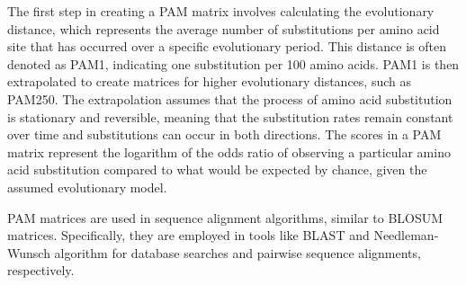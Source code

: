 The first step in creating a PAM matrix involves calculating the evolutionary distance, which represents the average number of substitutions per amino acid site that has occurred over a specific evolutionary period. This distance is often denoted as PAM1, indicating one substitution per 100 amino acids.  PAM1 is then extrapolated to create matrices for higher evolutionary distances, such as PAM250. The extrapolation assumes that the process of amino acid substitution is stationary and reversible, meaning that the substitution rates remain constant over time and substitutions can occur in both directions. The scores in a PAM matrix represent the logarithm of the odds ratio of observing a particular amino acid substitution compared to what would be expected by chance, given the assumed evolutionary model.

PAM matrices are used in sequence alignment algorithms, similar to BLOSUM matrices. Specifically, they are employed in tools like BLAST and Needleman-Wunsch algorithm for database searches and pairwise sequence alignments, respectively.